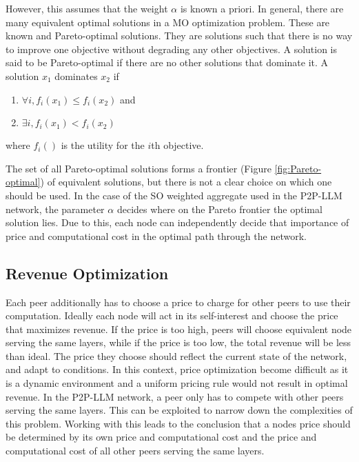 \documentclass[preprint,twoside,11pt]{article}
\begin{document}
However, this assumes that the weight $\alpha$ is known a priori. In general, there are many equivalent optimal solutions in a MO optimization problem.
These are known and Pareto-optimal solutions. They are solutions such that there is no way to improve one objective without degrading any other objectives.
A solution is said to be Pareto-optimal if there are no other solutions that dominate it. A solution $x_1$ dominates $x_2$ if
\begin{enumerate}
	\item $\forall i, f_i(x_1) \leq f_i(x_2)$ and
	\item $\exists i, f_i(x_1) < f_i(x_2)$
\end{enumerate}
where $f_i()$ is the utility for the $i$th objective.

The set of all Pareto-optimal solutions forms a frontier (Figure \ref{fig:Pareto-optimal}) of equivalent solutions, but there is not a clear choice on which one should be used.
In the case of the SO weighted aggregate used in the P2P-LLM network, the parameter $\alpha$ decides where on the Pareto frontier the optimal solution lies.
Due to this, each node can independently decide that importance of price and computational cost in the optimal path through the network.

\subsection{Revenue Optimization}

Each peer additionally has to choose a price to charge for other peers to use their computation.
Ideally each node will act in its self-interest and choose the price that maximizes revenue.
If the price is too high, peers will choose equivalent node serving the same layers,
while if the price is too low, the total revenue will be less than ideal.
The price they choose should reflect the current state of the network, and adapt to conditions.
In this context, price optimization become difficult as it is a dynamic environment
and a uniform pricing rule would not result in optimal revenue.
In the P2P-LLM network, a peer only has to compete with other peers serving the same layers.
This can be exploited to narrow down the complexities of this problem.
Working with this leads to the conclusion that a nodes price should be determined
by its own price and computational cost and the price and computational cost of all other peers serving the same layers.
\end{document}
